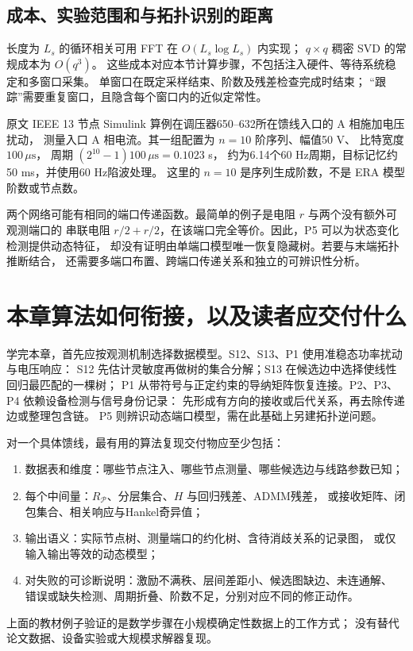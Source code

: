 \subsection{成本、实验范围和与拓扑识别的距离}
长度为 $L_s$ 的循环相关可用 FFT 在 $O(L_s\log L_s)$ 内实现；
$q\times q$ 稠密 SVD 的常规成本为 $O(q^3)$。
这些成本对应本节计算步骤，不包括注入硬件、等待系统稳定和多窗口采集。
单窗口在既定采样结束、阶数及残差检查完成时结束；
“跟踪”需要重复窗口，且隐含每个窗口内的近似定常性。

原文 IEEE 13 节点 Simulink 算例在调压器650--632所在馈线入口的 A 相施加电压扰动，
测量入口 A 相电流。其一组配置为 $n=10$ 阶序列、幅值50 V、
比特宽度 $100\,\mu\mathrm{s}$，
周期 $(2^{10}-1)100\,\mu\mathrm{s}=0.1023$ s，
约为6.14个60 Hz周期，目标记忆约50 ms，并使用60 Hz陷波处理。
这里的 $n=10$ 是序列生成阶数，不是 ERA 模型阶数或节点数。

两个网络可能有相同的端口传递函数。最简单的例子是电阻 $r$ 与两个没有额外可观测端口的
串联电阻 $r/2+r/2$，在该端口完全等价。因此，P5 可以为状态变化检测提供动态特征，
却没有证明由单端口模型唯一恢复隐藏树。若要与末端拓扑推断结合，
还需要多端口布置、跨端口传递关系和独立的可辨识性分析。

\section{本章算法如何衔接，以及读者应交付什么}
学完本章，首先应按观测机制选择数据模型。S12、S13、P1 使用准稳态功率扰动与电压响应：
S12 先估计灵敏度再做树的集合分解；S13 在候选边中选择使线性回归最匹配的一棵树；
P1 从带符号与正定约束的导纳矩阵恢复连接。P2、P3、P4 依赖设备检测与信号身份记录：
先形成有方向的接收或后代关系，再去除传递边或整理包含链。
P5 则辨识动态端口模型，需在此基础上另建拓扑逆问题。

对一个具体馈线，最有用的算法复现交付物应至少包括：
\begin{enumerate}
 \item 数据表和维度：哪些节点注入、哪些节点测量、哪些候选边与线路参数已知；
 \item 每个中间量：$R_{\mathcal P}$、分层集合、$H$ 与回归残差、ADMM残差，
       或接收矩阵、闭包集合、相关响应与Hankel奇异值；
 \item 输出语义：实际节点树、测量端口的约化树、含待消歧关系的记录图，
       或仅输入输出等效的动态模型；
 \item 对失败的可诊断说明：激励不满秩、层间差距小、候选图缺边、未连通解、
       错误或缺失检测、周期折叠、阶数不足，分别对应不同的修正动作。
\end{enumerate}
上面的教材例子验证的是数学步骤在小规模确定性数据上的工作方式；
没有替代论文数据、设备实验或大规模求解器复现。

